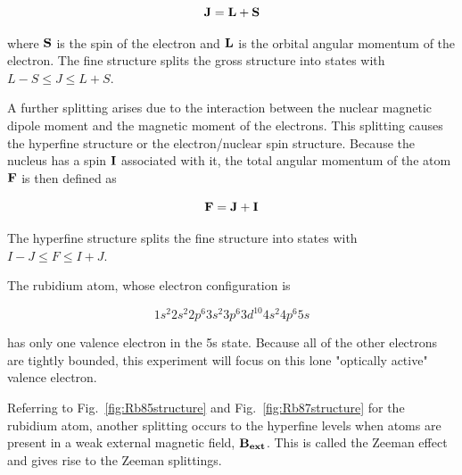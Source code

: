 \documentclass[%
 aip,
rsi,%
 amsmath,amssymb,
 reprint,%
author-numerical,%
]{revtex4-1}
\begin{document}
\begin{equation}
\bf{J}=\bf{L}+\bf{S}
\label{eq:one}
\end{equation}

\noindent where $\bf{S}$ is the spin of the electron and $\bf{L}$ is the orbital angular momentum of the electron. The fine structure splits the gross structure into states with  $L-S\leq J \leq L+S$.

\indent A further splitting arises due to the interaction between the nuclear magnetic dipole moment and the magnetic moment of the electrons. This splitting causes the hyperfine structure or the electron/nuclear spin structure. Because the nucleus has a spin $\bf{I}$ associated with it, the total angular momentum of the atom $\bf{F}$ is then defined as

\begin{equation}
\bf{F}=\bf{J}+\bf{I}
\label{eq:two}
\end{equation}

\noindent The hyperfine structure splits the fine structure into states with  $I-J\leq F \leq I+J$.


The rubidium atom, whose electron configuration is 

\begin{equation}
1 s ^ { 2 } 2 s ^ { 2 } 2 p ^ { 6 } 3 s ^ { 2 } 3 p ^ { 6 } 3 d ^ { 10 } 4 s ^ { 2 } 4 p ^ { 6 } 5 s
\label{eq:three}
\end{equation}

\noindent has only one valence electron in the 5s state. Because all of the other electrons are tightly bounded, this experiment will focus on this lone "optically active" valence electron.

Referring to Fig.~\ref{fig:Rb85structure} and Fig.~\ref{fig:Rb87structure} for the rubidium atom, another splitting occurs to the hyperfine levels when atoms are present in a weak external magnetic field, $\bf{B}_{ext}$. This is called the Zeeman effect and gives rise to the Zeeman splittings.
\end{document}

